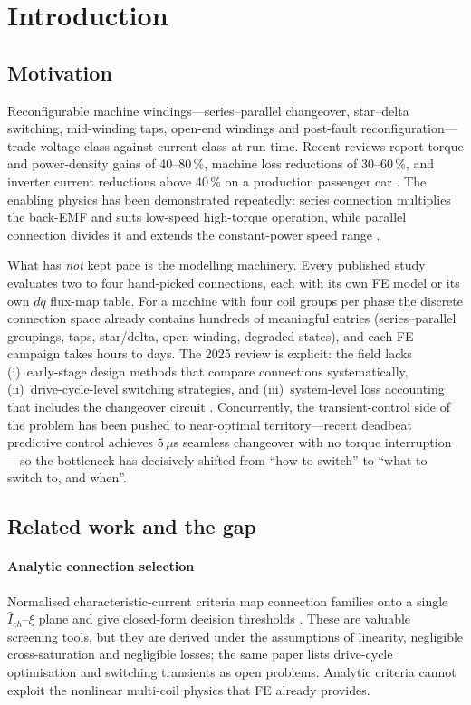 \documentclass[review]{elsarticle}
\begin{document}
\section{Introduction}
\label{sec:intro}

\subsection{Motivation}

Reconfigurable machine windings---series--parallel changeover, star--delta
switching, mid-winding taps, open-end windings and post-fault
reconfiguration---trade voltage class against current class at run time.
Recent reviews \cite{Best2025Access, RSER2025} report torque and
power-density gains of 40--80\,\%, machine
loss reductions of 30--60\,\%, and inverter current reductions above 40\,\% on
a production passenger car \cite{Best2025Access}. The enabling physics has
been demonstrated repeatedly: series connection multiplies the back-EMF and
suits low-speed high-torque operation, while parallel connection divides it
and extends the constant-power speed range \cite{Shin2024WEVJ,
TMAG2012Changeover}.

What has \emph{not} kept pace is the modelling machinery. Every published
study evaluates two to four hand-picked connections, each with its own FE
model or its own $dq$ flux-map table. For a machine with four coil groups per
phase the discrete connection space already contains hundreds of meaningful
entries (series--parallel groupings, taps, star/delta, open-winding, degraded
states), and each FE campaign takes hours to days. The 2025 review is
explicit: the field lacks (i)~early-stage design methods that compare
connections systematically, (ii)~drive-cycle-level switching strategies, and
(iii)~system-level loss accounting that includes the changeover circuit
\cite{Best2025Access}. Concurrently, the transient-control side of the
problem has been pushed to near-optimal territory---recent deadbeat
predictive control achieves $5\,\mu$s seamless changeover with no torque
interruption \cite{Guo2026Electronics, TPEL2026Seamless,
JESTPE2026Seamless}---so the bottleneck has decisively shifted from
``how to switch'' to ``what to switch to, and when''.

\subsection{Related work and the gap}

\paragraph{Analytic connection selection}
Normalised characteristic-current criteria map connection families onto a
single $\hat{I}_{ch}$--$\xi$ plane and give closed-form decision thresholds
\cite{Energies2026Ich}. These are valuable screening tools, but they are derived
under the assumptions of linearity, negligible cross-saturation and
negligible losses; the same paper lists
drive-cycle optimisation and switching transients as open problems. Analytic
criteria cannot exploit the nonlinear multi-coil physics that FE already
provides.
\end{document}
